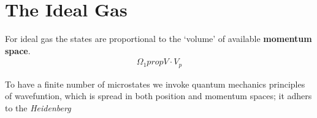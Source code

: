 \documentclass{book}
\begin{document}
\section{The Ideal Gas}%
\label{sec:ideal gas multiplcity}

\item For ideal gas the states are proportional to the `volume' of available \textbf{momentum space}.
	\begin{align*}
		\Omega_1 prop V \cdot V_p
	\end{align*}

\item To have a finite number of microstates we invoke quantum mechanics principles of wavefuntion,
	which is spread in both position and momentum spaces; it adhers to the \textit{Heidenberg}
\end{document}
